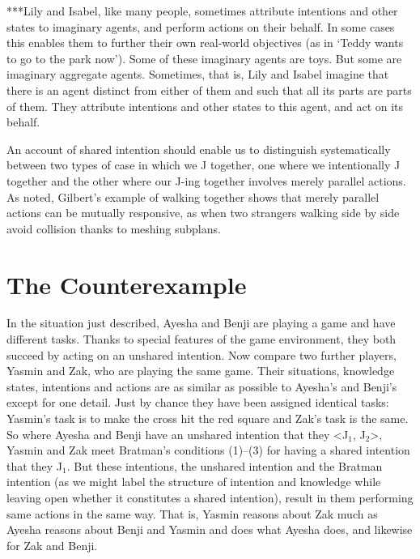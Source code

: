 \documentclass[12pt,\papersize]{extarticle}
\begin{document}
***Lily and Isabel, 
	like many people, 
 	sometimes attribute intentions and other states to imaginary agents, and perform actions on their behalf. 
In some cases this enables them to further their own real-world objectives (as in `Teddy wants to go to the park now').	
Some of these imaginary agents are toys. 
But some are imaginary aggregate agents. 
Sometimes, that is, Lily and Isabel imagine that there is an agent distinct from either of them and such that all its parts are parts of them.
They attribute intentions and other states to this agent, and act on its behalf.






An account of shared intention should enable us to  distinguish systematically between two types of case in which we J together, one where we intentionally J together and the other where  our J-ing together involves  merely parallel actions.
As noted, Gilbert's example of walking together shows that merely parallel actions can be mutually responsive, as when two strangers walking side by side avoid collision thanks to meshing subplans.



\section{The Counterexample}

In the situation just described,
Ayesha and Benji are playing a game and have different tasks.
Thanks to special features of the game environment, they both succeed by acting on an unshared intention.
Now compare two further players, Yasmin and Zak, who are playing the same game. 
Their situations, knowledge states, intentions and actions are as similar as possible to Ayesha's and Benji's except for one detail.
Just by chance they have been assigned identical tasks: Yasmin's task is to make the cross hit the red square and Zak's task is the same.
So where Ayesha and Benji have an unshared intention that they <J$_1$, J$_2$>,
Yasmin and Zak meet Bratman's conditions (1)--(3) for having a shared intention that they J$_1$.  
But these intentions, the unshared intention and the Bratman intention (as we might label the structure of intention and knowledge while leaving open whether it constitutes a shared intention), result in them performing same actions in the same way.
That is, Yasmin reasons about Zak much as Ayesha reasons about Benji and Yasmin and does what Ayesha does, and likewise for Zak and Benji. 
\end{document}
